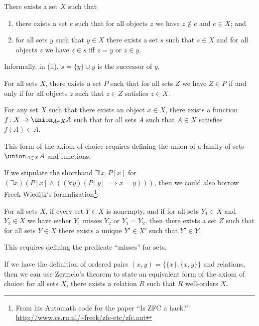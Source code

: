 \begin{node}[Axioms]
\begin{node}[Infinity]\label{set:zfc-0007}%
There exists a set $X$ such that
\begin{enumerate}[label=(\roman*)]
\item there exists a set $e$ such that for all objects $z$ we have
  $z\notin e$ and $e\in X$; and
\item for all sets $y$ such that $y\in X$ there exists a set $s$ such
  that $s\in X$ and for all objects $z$ we have $z\in s$ iff $z=y$ or
  $z\in y$.
\end{enumerate}
Informally, in (ii), $s=\{y\}\cup y$ is the successor of $y$.
\end{node}

\begin{node}\label{set:zfc-0008}%
For all sets $X$, there exists a set $P$ such that for all sets $Z$ we
have $Z\in P$ if and only if for all objects $z$ such that $z\in Z$
satisfies $z\in X$.
\end{node}

\begin{node}[Choice]\label{set:zfc-0009}%
For any set $X$ such that there exists an object $x\in X$,
there exists a function $f\colon X\to\union_{A\in X}A$ such that for
all sets $A$ such that $A\in X$ satisfies $f(A)\in A$.

\begin{node}\label{set:zfc-000A}%
This form of the axiom of choice requires defining the union of a family
of sets $\union_{A\in X}A$ and functions.
\end{node}

\begin{node}\label{set:zfc-000B}%
If we stipulate the shorthand $\exists!x,P[x]$ for
$(\exists x)(P[x]\land((\forall y)(P[y]\implies x=y)))$, then we could
also borrow Freek Wiedijk's formalization\footnote{From his Automath
code for the paper ``Is ZFC a hack?''~\cite{wiedijk2006zf} \url{http://www.cs.ru.nl/~freek/zfc-etc/zfc.aut}}:

For all sets $X$, if every set $Y\in X$ is nonempty, 
and if for all sets $Y_{1}\in X$ and $Y_{2}\in X$ we have either
$Y_{1}$ misses $Y_{2}$ or $Y_{1}=Y_{2}$,
then there exists a set $Z$ such that for all sets $Y\in X$ there exists
a unique $Y'\in X'$ such that $Y'\in Y$.

This requires defining the predicate ``misses'' for sets.
\end{node}

\begin{node}\label{set:zfc-000C}%
If we have the definition of ordered pairs $(x,y)=\{\{x\},\{x,y\}\}$
and relations, then we can use Zermelo's theorem to state an equivalent
form of the axiom of choice: for all sets $X$, there exists a relation
$R$ such that $R$ well-orders $X$.


\end{node}
\end{node}
\end{node}
